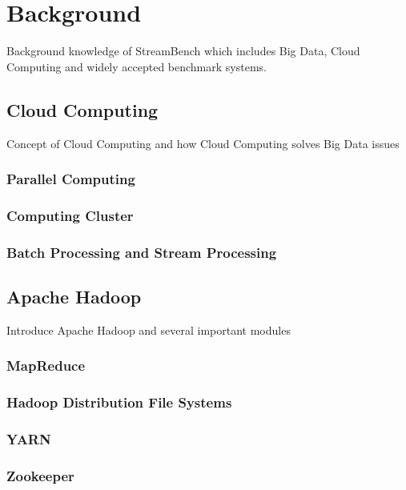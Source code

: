 \chapter{Background}
Background knowledge of StreamBench which includes Big Data, Cloud Computing and widely accepted benchmark systems. 

\section{Cloud Computing} 
Concept of Cloud Computing and how Cloud Computing solves Big Data issues

\subsection{Parallel Computing}
\subsection{Computing Cluster}
\subsection{Batch Processing and Stream Processing}

\section{Apache Hadoop}
Introduce Apache Hadoop and several important modules

\subsection{MapReduce}
\subsection{Hadoop Distribution File Systems}
\subsection{YARN}
\subsection{Zookeeper}


